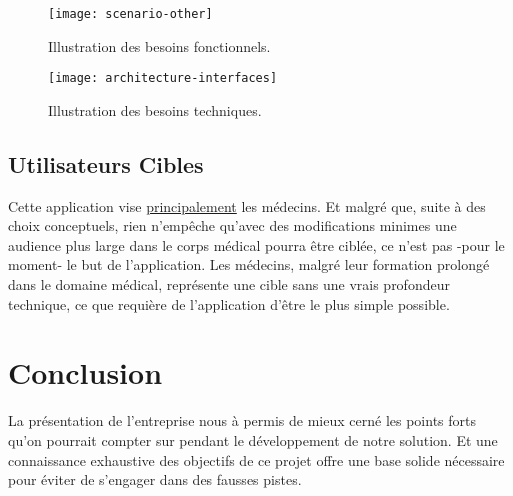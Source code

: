 \begin{figure}
\center
\texttt{[image: scenario-other]}
\caption{Illustration des besoins fonctionnels.}
\end{figure}

\begin{figure}
\center
\texttt{[image: architecture-interfaces]}
\caption{Illustration des besoins techniques.}
\end{figure}


\subsection{Utilisateurs Cibles}

Cette application vise \underline{principalement} les médecins. Et
malgré que, suite à des choix conceptuels, rien n’empêche qu’avec des
modifications minimes une audience plus large dans le corps médical
pourra être ciblée, ce n’est pas -pour le moment- le but de
l’application. Les médecins, malgré leur formation prolongé dans le
domaine médical, représente une cible sans une vrais profondeur
technique, ce que requière de l’application d’être le plus simple
possible.

\section{Conclusion} 

La présentation de l'entreprise nous à permis de mieux cerné les points
forts qu'on pourrait compter sur pendant le développement de notre
solution. Et une connaissance exhaustive des objectifs de ce projet
offre une base solide nécessaire pour éviter de s’engager dans des
fausses pistes.
